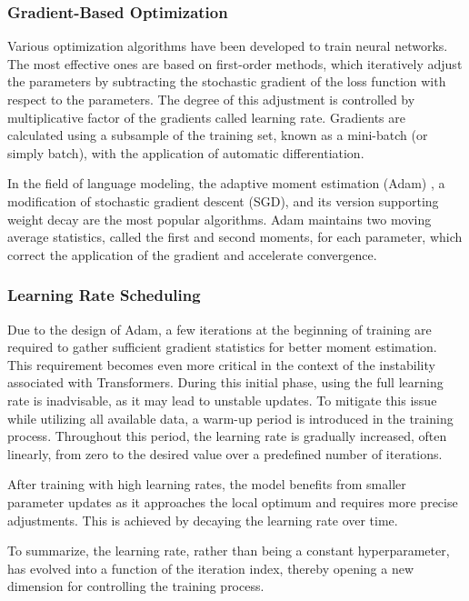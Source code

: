 \subsubsection*{Gradient-Based Optimization}

Various optimization algorithms have been developed to train neural networks. The most effective ones are based on first-order methods, which iteratively adjust the parameters by subtracting the stochastic gradient of the loss function with respect to the parameters. The degree of this adjustment is controlled by multiplicative factor of the gradients called learning rate. Gradients are calculated using a subsample of the training set, known as a mini-batch (or simply batch), with the application of automatic differentiation.

In the field of language modeling, the adaptive moment estimation (Adam) \parencite{kingma2014}, a modification of stochastic gradient descent (SGD), and its version supporting weight decay \parencite{loshchilov2017} are the most popular algorithms. Adam maintains two moving average statistics, called the first and second moments, for each parameter, which correct the application of the gradient and accelerate convergence.

\subsubsection*{Learning Rate Scheduling}

Due to the design of Adam, a few iterations at the beginning of training are required to gather sufficient gradient statistics for better moment estimation. This requirement becomes even more critical in the context of the instability associated with Transformers. During this initial phase, using the full learning rate is inadvisable, as it may lead to unstable updates. To mitigate this issue while utilizing all available data, a warm-up period is introduced in the training process. Throughout this period, the learning rate is gradually increased, often linearly, from zero to the desired value over a predefined number of iterations.

After training with high learning rates, the model benefits from smaller parameter updates as it approaches the local optimum and requires more precise adjustments. This is achieved by decaying the learning rate over time.

To summarize, the learning rate, rather than being a constant hyperparameter, has evolved into a function of the iteration index, thereby opening a new dimension for controlling the training process.

